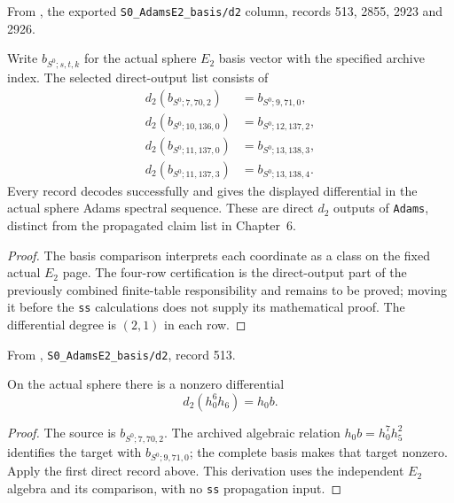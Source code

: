 \begin{theorem}
\label{sem:AdamsComputation:direct-d2-records}
From \cite{LinProgram}, the exported \texttt{S0\_AdamsE2\_basis/d2}
column, records 513, 2855, 2923 and 2926.\par
Write $b_{S^0;s,t,k}$ for the actual sphere $E_2$ basis vector with the
specified archive index. The selected direct-output list consists of
\[
\begin{aligned}
d_2(b_{S^0;7,70,2})&=b_{S^0;9,71,0},\\
d_2(b_{S^0;10,136,0})&=b_{S^0;12,137,2},\\
d_2(b_{S^0;11,137,0})&=b_{S^0;13,138,3},\\
d_2(b_{S^0;11,137,3})&=b_{S^0;13,138,4}.
\end{aligned}
\]
Every record decodes successfully and gives the displayed differential
in the actual sphere Adams spectral sequence. These are direct $d_2$
outputs of \texttt{Adams}, distinct from the propagated claim list in
Chapter~6.
\end{theorem}
\begin{proof}
The basis comparison interprets each coordinate as a class on the fixed
actual $E_2$ page. The four-row certification is the direct-output part
of the previously combined finite-table responsibility and remains to be
proved; moving it before the \texttt{ss} calculations does not supply
its mathematical proof. The differential degree is $(2,1)$ in each row.
\end{proof}

\begin{theorem}
\label{sem:AdamsComputation:direct-d2-h0-six-h6}
From \cite{LinProgram}, \texttt{S0\_AdamsE2\_basis/d2}, record 513.\par
On the actual sphere there is a nonzero differential
\[
d_2(h_0^6h_6)=h_0b.
\]
\end{theorem}
\begin{proof}
The source is $b_{S^0;7,70,2}$. The archived algebraic relation
$h_0b=h_0^7h_5^2$ identifies the target with $b_{S^0;9,71,0}$;
the complete basis makes that target nonzero. Apply the first direct
record above. This derivation uses the independent $E_2$ algebra and
its comparison, with no \texttt{ss} propagation input.
\end{proof}


